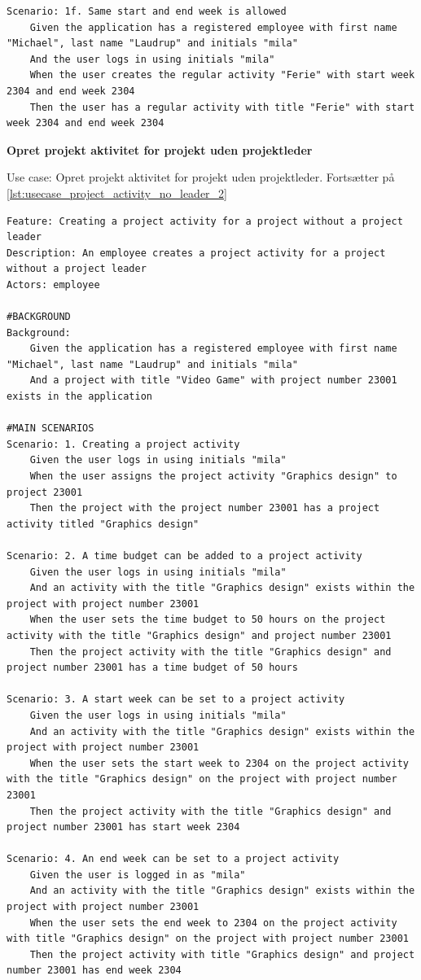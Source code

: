 \begin{listing}[H]
\begin{verbatim}
Scenario: 1f. Same start and end week is allowed
    Given the application has a registered employee with first name "Michael", last name "Laudrup" and initials "mila"
    And the user logs in using initials "mila"
    When the user creates the regular activity "Ferie" with start week 2304 and end week 2304
    Then the user has a regular activity with title "Ferie" with start week 2304 and end week 2304
    \end{verbatim}
\end{listing}
\textbf{Opret projekt aktivitet for projekt uden projektleder}
\begin{listing}[H]
    \centering
    \caption{Use case: Opret projekt aktivitet for projekt uden projektleder. Fortsætter på \cref{lst:usecase_project_activity_no_leader_2}} \label{lst:usecase_project_activity_no_leader}
    \begin{verbatim}  
Feature: Creating a project activity for a project without a project leader
Description: An employee creates a project activity for a project without a project leader
Actors: employee

#BACKGROUND
Background:
    Given the application has a registered employee with first name "Michael", last name "Laudrup" and initials "mila"
    And a project with title "Video Game" with project number 23001 exists in the application

#MAIN SCENARIOS
Scenario: 1. Creating a project activity
    Given the user logs in using initials "mila"
    When the user assigns the project activity "Graphics design" to project 23001
    Then the project with the project number 23001 has a project activity titled "Graphics design"

Scenario: 2. A time budget can be added to a project activity
    Given the user logs in using initials "mila"
    And an activity with the title "Graphics design" exists within the project with project number 23001
    When the user sets the time budget to 50 hours on the project activity with the title "Graphics design" and project number 23001
    Then the project activity with the title "Graphics design" and project number 23001 has a time budget of 50 hours

Scenario: 3. A start week can be set to a project activity
    Given the user logs in using initials "mila"
    And an activity with the title "Graphics design" exists within the project with project number 23001
    When the user sets the start week to 2304 on the project activity with the title "Graphics design" on the project with project number 23001
    Then the project activity with the title "Graphics design" and project number 23001 has start week 2304

Scenario: 4. An end week can be set to a project activity
    Given the user is logged in as "mila"
    And an activity with the title "Graphics design" exists within the project with project number 23001
    When the user sets the end week to 2304 on the project activity with title "Graphics design" on the project with project number 23001
    Then the project activity with title "Graphics design" and project number 23001 has end week 2304
    \end{verbatim}
\end{listing}
